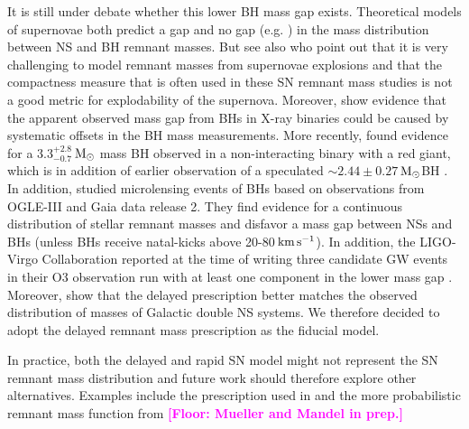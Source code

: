 \documentclass[twocolumn]{aastex63}
\newcommand{\floor}[1]{\textbf{\textcolor{magenta}{[Floor: #1]}}}
\newcommand{\question}[1]{\textcolor{OliveGreen}{[Question: #1]}}
\newcommand{\kms}{\ensuremath{\,\rm{km}\,\rm{s}^{-1}}\xspace}
\newcommand{\Msun}{\ensuremath{\,\rm{M}_{\odot}}\xspace}
\begin{document}
	It is still under debate whether this lower \ac{BH} mass gap exists. Theoretical models of supernovae both predict a gap \citep{2014ApJ...785...28K,2015ApJ...801...90P} and no  gap (e.g. \citealt{1995ApJS..101..181W,2001ApJ...554..548F,2019arXiv191001641E, 2020arXiv200304320C})  in the mass distribution between \ac{NS} and \ac{BH} remnant masses. But see also \citet{2020MNRAS.491.2715B} who point out that it is very challenging to model remnant masses from supernovae explosions and that the compactness measure that is often used in these \ac{SN}  remnant mass studies is not a good metric for explodability of the supernova. 
	Moreover, \citet{2012ApJ...757...36K}   show evidence that the apparent observed mass gap from BHs in X-ray binaries could be caused by systematic offsets in the \ac{BH} mass measurements.  
	More recently, \citet{2019Sci...366..637T} found evidence for a $3.3_{-0.7}^{+2.8}$\Msun mass \ac{BH} observed in a non-interacting binary with a red giant, which is in addition of earlier observation of a speculated $\sim 2.44\pm0.27$\Msun \ac{BH} \citep{2002A&A...392..909C,2010AAS...21541905R,2011arXiv1107.1537D}. 
	In addition,  \citet{2016MNRAS.458.3012W,2019arXiv190407789W} studied microlensing events of BHs based on  observations from OGLE-III and Gaia data release 2.  
	They find evidence for a continuous distribution of stellar remnant masses and disfavor a mass gap between NSs and BHs (unless BHs receive natal-kicks above 20-80\kms).   
	In addition, the LIGO-Virgo Collaboration reported at the time of writing three candidate \ac{GW} events in their O3 observation run with at least one component in the lower mass gap \citep{GCNS190924h,GCNS190930s,GCNSS200115j}.	
	Moreover, \citet{2018MNRAS.481.4009V} show that the delayed prescription better matches the observed distribution of masses of Galactic double \ac{NS} systems. 
We  therefore decided to adopt the delayed remnant mass prescription as the fiducial model. 
	
In practice, both the delayed and rapid \ac{SN} model might not represent the \ac{SN} remnant mass distribution and future work should therefore explore other alternatives. Examples include the \citet{2016MNRAS.460..742M} prescription used in \citet{2018MNRAS.481.4009V} and the more probabilistic remnant mass function from \floor{Mueller and Mandel in prep.}
\end{document}
